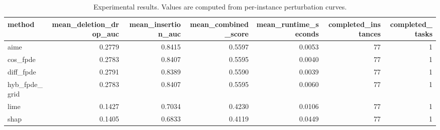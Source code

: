 \begin{table}[t]
\caption{Experimental results. Values are computed from per-instance perturbation curves.}
\label{tab:main_results_computed}
\centering
\begin{tabular}{lrrrrrr}
\toprule
method & mean\_deletion\_drop\_auc & mean\_insertion\_auc & mean\_combined\_score & mean\_runtime\_seconds & completed\_instances & completed\_tasks \\
\midrule
aime & 0.2779 & 0.8415 & 0.5597 & 0.0053 & 77 & 1 \\
cos\_fpde & 0.2783 & 0.8407 & 0.5595 & 0.0040 & 77 & 1 \\
diff\_fpde & 0.2791 & 0.8389 & 0.5590 & 0.0039 & 77 & 1 \\
hyb\_fpde\_grid & 0.2783 & 0.8407 & 0.5595 & 0.0060 & 77 & 1 \\
lime & 0.1427 & 0.7034 & 0.4230 & 0.0106 & 77 & 1 \\
shap & 0.1405 & 0.6833 & 0.4119 & 0.0449 & 77 & 1 \\
\bottomrule
\end{tabular}

\end{table}
